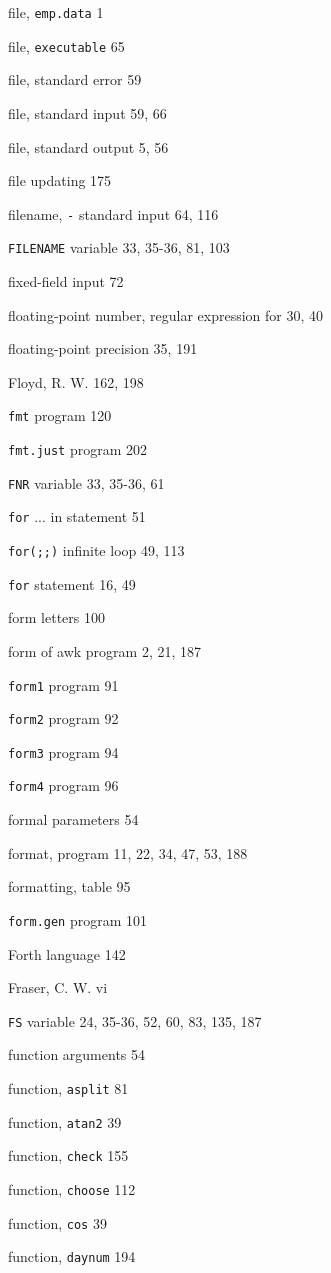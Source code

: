 \begin{multicols}{3}
file, \verb'emp.data' 1

file, \verb'executable' 65

file, standard error 59

file, standard input 59, 66

file, standard output 5, 56

file updating 175

filename, \verb'-' standard input 64, 116

\verb'FILENAME' variable 33, 35-36, 81, 103

fixed-field input 72

floating-point number, regular expression for 30, 40

floating-point precision 35, 191

Floyd, R. W. 162, 198

\verb'fmt' program 120

\verb'fmt.just' program 202

\verb'FNR' variable 33, 35-36, 61

\verb'for' ... in statement 51

\verb'for(;;)' infinite loop 49, 113

\verb'for' statement 16, 49

form letters 100

form of awk program 2, 21, 187

\verb'form1' program 91

\verb'form2' program 92

\verb'form3' program 94

\verb'form4' program 96

formal parameters 54

format, program 11, 22, 34, 47, 53, 188

formatting, table 95

\verb'form.gen' program 101

Forth language 142

Fraser, C. W. vi

\verb'FS' variable 24, 35-36, 52, 60, 83, 135, 187

function arguments 54

function, \verb'asplit' 81

function, \verb'atan2' 39

function, \verb'check' 155

function, \verb'choose' 112

function, \verb'cos' 39

function, \verb'daynum' 194


\end{multicols}
